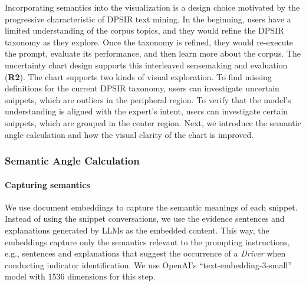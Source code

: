 Incorporating semantics into the visualization is a design choice motivated by the progressive characteristic of DPSIR text mining. 
In the beginning, users have a limited understanding of the corpus topics, and they would refine the DPSIR taxonomy as they explore. 
Once the taxonomy is refined, they would re-execute the prompt, evaluate its performance, and then learn more about the corpus.
The uncertainty chart design supports this interleaved sensemaking and evaluation (\textbf{R2}).
The chart supports two kinds of visual exploration. To find missing definitions for the current DPSIR taxonomy, users can investigate uncertain snippets, which are outliers in the peripheral region. To verify that the model's understanding is aligned with the expert's intent, users can investigate certain snippets, which are grouped in the center region.
Next, we introduce the semantic angle calculation and how the visual clarity of the chart is improved.

\subsubsection{Semantic Angle Calculation} 
\paragraph{Capturing semantics}
We use document embeddings to capture the semantic meanings of each snippet. Instead of using the snippet conversations, we use the evidence sentences and explanations generated by LLMs as the embedded content. This way, the embeddings capture only the semantics relevant to the prompting instructions, e.g., sentences and explanations that suggest the occurrence of a \textit{Driver} when conducting indicator identification. We use OpenAI's ``text-embedding-3-small'' model with 1536 dimensions for this step.

